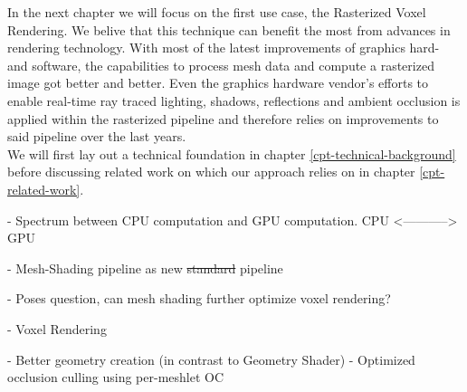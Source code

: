 \noindent
In the next chapter we will focus on the first use case, the Rasterized Voxel Rendering. We belive that this 
technique can benefit the most from advances in rendering technology.
With most of the latest improvements of graphics hard- and software, the capabilities to process mesh data 
and compute a rasterized image got better and better. Even the graphics hardware vendor's efforts to enable 
real-time ray traced lighting, shadows, reflections and ambient occlusion is applied within the rasterized 
pipeline and therefore relies on improvements to said pipeline over the last years. \\
We will first lay out a technical foundation in chapter \ref{cpt-technical-background} before discussing 
related work on which our approach relies on in chapter \ref{cpt-related-work}.



- Spectrum between CPU computation and GPU computation. 
CPU <-----------> GPU

- Mesh-Shading pipeline as new \st{standard} pipeline

- Poses question, can mesh shading further optimize voxel rendering?

- Voxel Rendering

- Better geometry creation (in contrast to Geometry Shader)
- Optimized occlusion culling using per-meshlet OC
